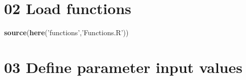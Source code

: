 \documentclass[
]{article}
\newenvironment{Shaded}{\begin{snugshade}}{\end{snugshade}}
\newcommand{\KeywordTok}[1]{\textcolor[rgb]{0.13,0.29,0.53}{\textbf{#1}}}
\newcommand{\NormalTok}[1]{#1}
\newcommand{\StringTok}[1]{\textcolor[rgb]{0.31,0.60,0.02}{#1}}
\begin{document}
\hypertarget{load-functions}{%
\section{02 Load functions}\label{load-functions}}

\begin{Shaded}
\begin{Highlighting}[]
\KeywordTok{source}\NormalTok{(}\KeywordTok{here}\NormalTok{(}\StringTok{'functions'}\NormalTok{,}\StringTok{'Functions.R'}\NormalTok{))}
\end{Highlighting}
\end{Shaded}

\hypertarget{define-parameter-input-values}{%
\section{03 Define parameter input
values}\label{define-parameter-input-values}}
\end{document}

